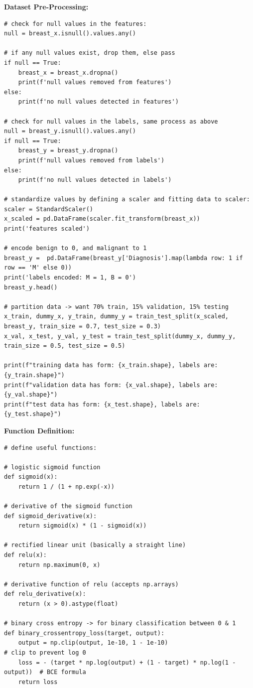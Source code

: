\documentclass[a4paper]{article}
\begin{document}
\textbf{Dataset Pre-Processing:}
\begin{lstlisting}[basicstyle= \scriptsize]
# check for null values in the features:
null = breast_x.isnull().values.any()   

# if any null values exist, drop them, else pass
if null == True:
    breast_x = breast_x.dropna() 
    print(f'null values removed from features')
else:
    print(f'no null values detected in features')

# check for null values in the labels, same process as above
null = breast_y.isnull().values.any()
if null == True:
    breast_y = breast_y.dropna()
    print(f'null values removed from labels')
else:
    print(f'no null values detected in labels')
    
# standardize values by defining a scaler and fitting data to scaler:
scaler = StandardScaler()
x_scaled = pd.DataFrame(scaler.fit_transform(breast_x))
print('features scaled')

# encode benign to 0, and malignant to 1
breast_y =  pd.DataFrame(breast_y['Diagnosis'].map(lambda row: 1 if row == 'M' else 0))
print('labels encoded: M = 1, B = 0')
breast_y.head()

# partition data -> want 70% train, 15% validation, 15% testing
x_train, dummy_x, y_train, dummy_y = train_test_split(x_scaled, breast_y, train_size = 0.7, test_size = 0.3)
x_val, x_test, y_val, y_test = train_test_split(dummy_x, dummy_y, train_size = 0.5, test_size = 0.5)

print(f"training data has form: {x_train.shape}, labels are: {y_train.shape}")
print(f"validation data has form: {x_val.shape}, labels are: {y_val.shape}")
print(f"test data has form: {x_test.shape}, labels are: {y_test.shape}")
\end{lstlisting}

\newpage
\textbf{Function Definition:}
\begin{lstlisting}[basicstyle= \scriptsize]
# define useful functions:

# logistic sigmoid function
def sigmoid(x):
    return 1 / (1 + np.exp(-x))

# derivative of the sigmoid function
def sigmoid_derivative(x):
    return sigmoid(x) * (1 - sigmoid(x))

# rectified linear unit (basically a straight line)
def relu(x):
    return np.maximum(0, x)

# derivative function of relu (accepts np.arrays)
def relu_derivative(x):
    return (x > 0).astype(float)

# binary cross entropy -> for binary classification between 0 & 1
def binary_crossentropy_loss(target, output):
    output = np.clip(output, 1e-10, 1 - 1e-10)                              # clip to prevent log 0
    loss = - (target * np.log(output) + (1 - target) * np.log(1 - output))  # BCE formula
    return loss    
\end{lstlisting}
\end{document}
